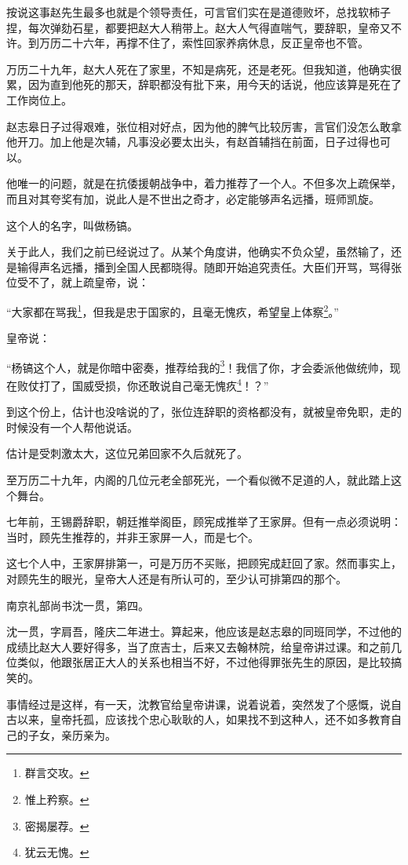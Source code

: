 \begin{multicols}{\theparacolNo}
		按说这事赵先生最多也就是个领导责任，可言官们实在是道德败坏，总找软柿子捏，每次弹劾石星，都要把赵大人稍带上。赵大人气得直喘气，要辞职，皇帝又不许。到万历二十六年，再撑不住了，索性回家养病休息，反正皇帝也不管。

		万历二十九年，赵大人死在了家里，不知是病死，还是老死。但我知道，他确实很累，因为直到他死的那天，辞职都没有批下来，用今天的话说，他应该算是死在了工作岗位上。

		赵志皋日子过得艰难，张位相对好点，因为他的脾气比较厉害，言官们没怎么敢拿他开刀。加上他是次辅，凡事没必要太出头，有赵首辅挡在前面，日子过得也可以。

		他唯一的问题，就是在抗倭援朝战争中，着力推荐了一个人。不但多次上疏保举，而且对其夸奖有加，说此人是不世出之奇才，必定能够声名远播，班师凯旋。

		这个人的名字，叫做杨镐。

		关于此人，我们之前已经说过了。从某个角度讲，他确实不负众望，虽然输了，还是输得声名远播，播到全国人民都晓得。随即开始追究责任。大臣们开骂，骂得张位受不了，就上疏皇帝，说：

		“大家都在骂我\footnote{群言交攻。}，但我是忠于国家的，且毫无愧疚，希望皇上体察\footnote{惟上矜察。}。”

		皇帝说：

		“杨镐这个人，就是你暗中密奏，推荐给我的\footnote{密揭屡荐。}！我信了你，才会委派他做统帅，现在败仗打了，国威受损，你还敢说自己毫无愧疚\footnote{犹云无愧。}！？”

		到这个份上，估计也没啥说的了，张位连辞职的资格都没有，就被皇帝免职，走的时候没有一个人帮他说话。

		估计是受刺激太大，这位兄弟回家不久后就死了。

		至万历二十九年，内阁的几位元老全部死光，一个看似微不足道的人，就此踏上这个舞台。

		七年前，王锡爵辞职，朝廷推举阁臣，顾宪成推举了王家屏。但有一点必须说明：当时，顾先生推荐的，并非王家屏一人，而是七个。

		这七个人中，王家屏排第一，可是万历不买账，把顾宪成赶回了家。然而事实上，对顾先生的眼光，皇帝大人还是有所认可的，至少认可排第四的那个。

		南京礼部尚书沈一贯，第四。

		沈一贯，字肩吾，隆庆二年进士。算起来，他应该是赵志皋的同班同学，不过他的成绩比赵大人要好得多，当了庶吉士，后来又去翰林院，给皇帝讲过课。和之前几位类似，他跟张居正大人的关系也相当不好，不过他得罪张先生的原因，是比较搞笑的。

		事情经过是这样，有一天，沈教官给皇帝讲课，说着说着，突然发了个感慨，说自古以来，皇帝托孤，应该找个忠心耿耿的人，如果找不到这种人，还不如多教育自己的子女，亲历亲为。


\end{multicols}
